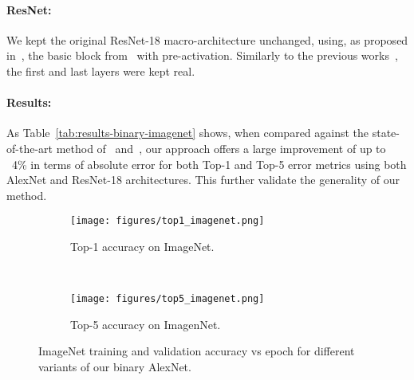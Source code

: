 \documentclass[10pt,twocolumn,letterpaper]{article}
\begin{document}
\paragraph{ResNet:} We kept the original ResNet-18 macro-architecture unchanged, using, as proposed in~\cite{rastegari2016xnor}, the basic block from~\cite{he2016identity} with pre-activation. Similarly to the previous works~\cite{rastegari2016xnor}, the first and last layers were kept real.

\paragraph{Results:} As Table~\ref{tab:results-binary-imagenet} shows, when compared against the state-of-the-art method of~\cite{rastegari2016xnor} and~\cite{courbariaux2016binarized}, our approach offers a large improvement of up to ~4\% in terms of absolute error for both Top-1 and Top-5 error metrics using both AlexNet and ResNet-18 architectures. This further validate the generality of our method.

\begin{figure*}[!htbp]
    \centering
    \begin{subfigure}[t]{0.47\textwidth}
    \centering
    \texttt{[image: figures/top1\_imagenet.png]}
    \caption{Top-1 accuracy on ImageNet.}
    \label{fig:imagenet-convergence-top1}
    \end{subfigure}
    ~
    \begin{subfigure}[t]{0.47\textwidth}
    \centering
    \texttt{[image: figures/top5\_imagenet.png]}
    \caption{Top-5 accuracy on ImagenNet.}
    \label{fig:imagenet-convergence-top5}
    \end{subfigure}
    \caption{ImageNet training and validation accuracy vs epoch for different variants of our binary AlexNet.}
    \label{fig:imagenet-convergence}
\end{figure*}
\end{document}

